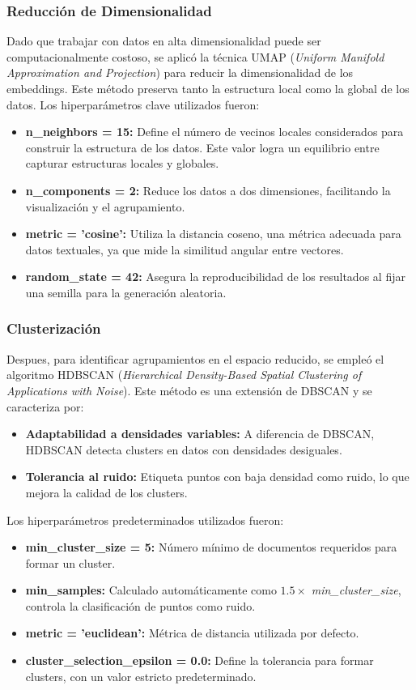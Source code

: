 \documentclass[10pt, a4paper]{article}
\begin{document}
	\subsubsection{Reducción de Dimensionalidad}
	Dado que trabajar con datos en alta dimensionalidad puede ser computacionalmente costoso, se aplicó la técnica UMAP (\textit{Uniform Manifold Approximation and Projection}) para reducir la dimensionalidad de los embeddings. Este método preserva tanto la estructura local como la global de los datos. Los hiperparámetros clave utilizados fueron:
	
	\begin{itemize}
		\item \textbf{n\_neighbors = 15:} Define el número de vecinos locales considerados para construir la estructura de los datos. Este valor logra un equilibrio entre capturar estructuras locales y globales.
		\item \textbf{n\_components = 2:} Reduce los datos a dos dimensiones, facilitando la visualización y el agrupamiento.
		\item \textbf{metric = 'cosine':} Utiliza la distancia coseno, una métrica adecuada para datos textuales, ya que mide la similitud angular entre vectores.
		\item \textbf{random\_state = 42:} Asegura la reproducibilidad de los resultados al fijar una semilla para la generación aleatoria.
	\end{itemize}

	
	\subsubsection{Clusterización}
	Despues, para identificar agrupamientos en el espacio reducido, se empleó el algoritmo HDBSCAN (\textit{Hierarchical Density-Based Spatial Clustering of Applications with Noise}). Este método es una extensión de DBSCAN y se caracteriza por:
	
	\begin{itemize}
		\item \textbf{Adaptabilidad a densidades variables:} A diferencia de DBSCAN, HDBSCAN detecta clusters en datos con densidades desiguales.
		\item \textbf{Tolerancia al ruido:} Etiqueta puntos con baja densidad como ruido, lo que mejora la calidad de los clusters.
	\end{itemize}
	
	Los hiperparámetros predeterminados utilizados fueron:
	\begin{itemize}
		\item \textbf{min\_cluster\_size = 5:} Número mínimo de documentos requeridos para formar un cluster.
		\item \textbf{min\_samples:} Calculado automáticamente como \(1.5 \times\) \textit{min\_cluster\_size}, controla la clasificación de puntos como ruido.
		\item \textbf{metric = 'euclidean':} Métrica de distancia utilizada por defecto.
		\item \textbf{cluster\_selection\_epsilon = 0.0:} Define la tolerancia para formar clusters, con un valor estricto predeterminado.
	\end{itemize}
\end{document}
